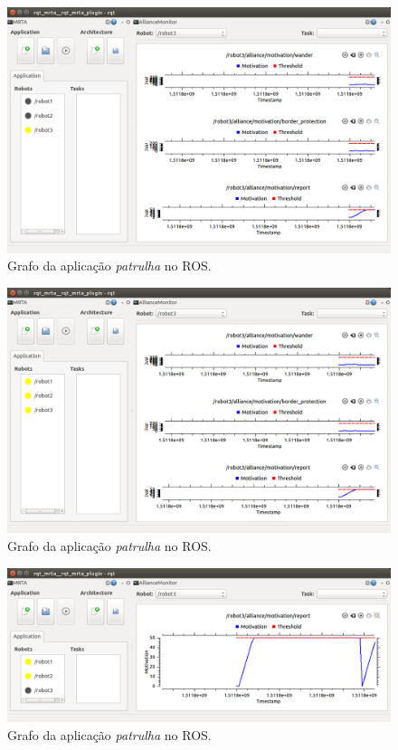             \begin{figure}[p]
                \centering
                \includegraphics[width=.75\textwidth]{Figuras/4_resultados/rqt_mrta3.png}
                \caption{Grafo da aplicação \textit{patrulha} no ROS.} \label{fig:rqt_mrta3}
            \end{figure}
        
            \begin{figure}[p]
                \centering
                \includegraphics[width=.75\textwidth]{Figuras/4_resultados/rqt_mrta4.png}
                \caption{Grafo da aplicação \textit{patrulha} no ROS.} \label{fig:rqt_mrta4}
            \end{figure}
        
            \begin{figure}[p]
                \centering
                \includegraphics[width=.75\textwidth]{Figuras/4_resultados/rqt_mrta5.png}
                \caption{Grafo da aplicação \textit{patrulha} no ROS.} \label{fig:rqt_mrta5}
            \end{figure}
            
